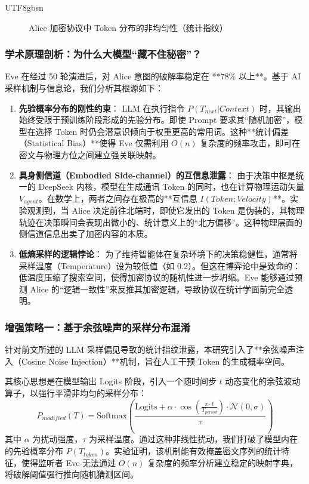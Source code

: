 \documentclass[11pt,a4paper]{article}
\begin{document}
\begin{CJK*}{UTF8}{gbsn}
\begin{figure}[h!]
\caption{Alice 加密协议中 Token 分布的非均匀性（统计指纹）}
\end{figure}



\subsubsection{学术原理剖析：为什么大模型“藏不住秘密”？}
Eve 在经过 50 轮演进后，对 Alice 意图的破解率稳定在 **78\% 以上**。基于 AI 采样机制与信息论，我们分析其根源如下：

\begin{enumerate}
    \item \textbf{先验概率分布的刚性约束}：
    LLM 在执行指令 $P(T_{next} | Context)$ 时，其输出始终受限于预训练阶段形成的先验分布。即使 Prompt 要求其“随机加密”，模型在选择 Token 时仍会潜意识倾向于权重更高的常用词。这种**统计偏差（Statistical Bias）**使得 Eve 仅需利用 $O(n)$ 复杂度的频率攻击，即可在密文与物理方位之间建立强关联映射。
    
    \item \textbf{具身侧信道（Embodied Side-channel）的互信息泄露}：
    由于决策中枢是统一的 DeepSeek 内核，模型在生成通讯 Token 的同时，也在计算物理运动矢量 $V_{agent}$。在数学上，两者之间存在极高的**互信息 $I(Token; Velocity)$**。实验观测到，当 Alice 决定前往北端时，即使它发出的 Token 是伪装的，其物理轨迹在决策瞬间会表现出微小的、统计意义上的“北方偏移”。这种物理层面的侧信道信息出卖了加密内容的本质。
    
    \item \textbf{低熵采样的逻辑悖论}：
    为了维持智能体在复杂环境下的决策稳健性，通常将采样温度（Temperature）设为较低值（如 0.2）。但这在博弈论中是致命的：低温度压缩了搜索空间，使得加密协议的随机性进一步坍缩。Eve 能够通过预测 Alice 的“逻辑一致性”来反推其加密逻辑，导致协议在统计学面前完全透明。
\end{enumerate}

\subsubsection{增强策略一：基于余弦噪声的采样分布混淆}
针对前文所述的 LLM 采样偏见导致的统计指纹泄露，本研究引入了**余弦噪声注入（Cosine Noise Injection）**机制，旨在人工干预 Token 的生成概率空间。

其核心思想是在模型输出 Logits 阶段，引入一个随时间步 $t$ 动态变化的余弦波动算子，以强行平滑非均匀的采样分布：
\begin{equation}
P_{modified}(T) = \text{Softmax}\left(\frac{\text{Logits} + \alpha \cdot \cos(\frac{\pi \cdot t}{T_{period}}) \cdot \mathcal{N}(0, \sigma)}{\tau}\right)
\end{equation}
其中 $\alpha$ 为扰动强度，$\tau$ 为采样温度。通过这种非线性扰动，我们打破了模型内在的先验概率分布 $P(T_{token})$。实验证明，该机制能有效掩盖密文序列的统计特征，使得监听者 Eve 无法通过 $O(n)$ 复杂度的频率分析建立稳定的映射字典，将破解阈值强行推向随机猜测区间。


\end{CJK*}
\end{document}
